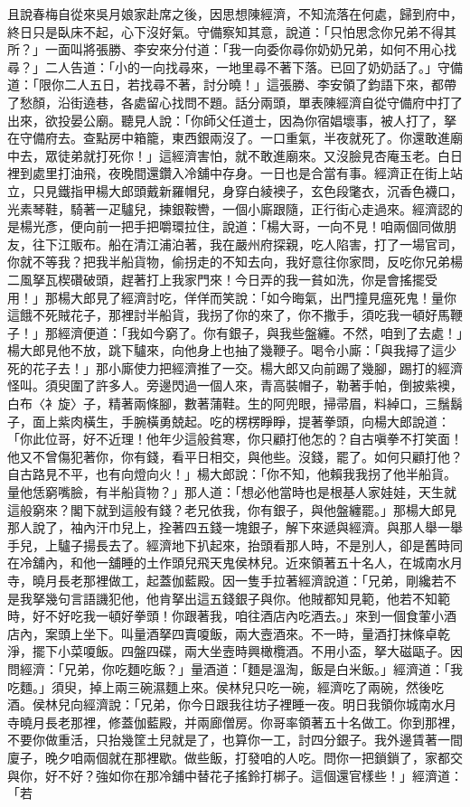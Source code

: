 \begin{showcontents}{}
且說春梅自從來吳月娘家赴席之後，因思想陳經濟，不知流落在何處，歸到府中，終日只是臥床不起，心下沒好氣。守備察知其意，說道：「只怕思念你兄弟不得其所？」一面叫將張勝、李安來分付道：「我一向委你尋你奶奶兄弟，如何不用心找尋？」二人告道：「小的一向找尋來，一地里尋不著下落。已回了奶奶話了。」守備道：「限你二人五日，若找尋不著，討分曉！」這張勝、李安領了鈞語下來，都帶了愁顏，沿街遶巷，各處留心找問不題。話分兩頭，單表陳經濟自從守備府中打了出來，欲投晏公廟。聽見人說：「你師父任道士，因為你宿娼壞事，被人打了，拏在守備府去。查點房中箱籠，東西銀兩沒了。一口重氣，半夜就死了。你還敢進廟中去，眾徒弟就打死你！」這經濟害怕，就不敢進廟來。又沒臉見杏庵玉老。白日裡到處里打油飛，夜晚間還鑽入冷舖中存身。一日也是合當有事。經濟正在街上站立，只見鐵指甲楊大郎頭戴新羅帽兒，身穿白綾襖子，玄色段氅衣，沉香色襪口，光素琴鞋，騎著一疋驢兒，揀銀鞍轡，一個小廝跟隨，正行街心走過來。經濟認的是楊光彥，便向前一把手把嚼環拉住，說道：「楊大哥，一向不見！咱兩個同做朋友，往下江販布。船在清江浦泊著，我在嚴州府探親，吃人陷害，打了一場官司，你就不等我？把我半船貨物，偷拐走的不知去向，我好意往你家問，反吃你兄弟楊二風拏瓦楔礸破頭，趕著打上我家門來！今日弄的我一貧如洗，你是會搖擺受用！」那楊大郎見了經濟討吃，佯佯而笑說：「如今晦氣，出門撞見瘟死鬼！量你這餓不死賊花子，那裡討半船貨，我拐了你的來了，你不撒手，須吃我一頓好馬鞭子！」那經濟便道：「我如今窮了。你有銀子，與我些盤纏。不然，咱到了去處！」楊大郎見他不放，跳下驢來，向他身上也抽了幾鞭子。喝令小廝：「與我撏了這少死的花子去！」那小廝使力把經濟推了一交。楊大郎又向前踢了幾腳，踢打的經濟怪叫。須臾圍了許多人。旁邊閃過一個人來，青高裝帽子，勒著手帕，倒披紫襖，白布〈衤旋〉子，精著兩條腳，數著蒲鞋。生的阿兜眼，掃帚眉，料綽口，三鬚鬍子，面上紫肉橫生，手腕橫勇兢起。吃的楞楞睜睜，提著拳頭，向楊大郎說道：「你此位哥，好不近理！他年少這般貧寒，你只顧打他怎的？自古嗔拳不打笑面！他又不曾傷犯著你，你有錢，看平日相交，與他些。沒錢，罷了。如何只顧打他？自古路見不平，也有向燈向火！」楊大郎說：「你不知，他賴我我拐了他半船貨。量他恁窮嘴臉，有半船貨物？」那人道：「想必他當時也是根基人家娃娃，天生就這般窮來？閣下就到這般有錢？老兄依我，你有銀子，與他盤纏罷。」那楊大郎見那人說了，袖內汗巾兒上，拴著四五錢一塊銀子，解下來遞與經濟。與那人舉一舉手兒，上驢子揚長去了。經濟地下扒起來，抬頭看那人時，不是別人，卻是舊時同在冷舖內，和他一舖睡的土作頭兒飛天鬼侯林兒。近來領著五十名人，在城南水月寺，曉月長老那裡做工，起蓋伽藍殿。因一隻手拉著經濟說道：「兄弟，剛纔若不是我拏幾句言語譏犯他，他肯拏出這五錢銀子與你。他賊都知見範，他若不知範時，好不好吃我一頓好拳頭！你跟著我，咱往酒店內吃酒去。」來到一個食葷小酒店內，案頭上坐下。叫量酒拏四賣嗄飯，兩大壼酒來。不一時，量酒打抹條卓乾淨，擺下小菜嗄飯。四盤四碟，兩大坐壼時興橄欖酒。不用小盃，拏大磁甌子。因問經濟：「兄弟，你吃麵吃飯？」量酒道：「麵是溫淘，飯是白米飯。」經濟道：「我吃麵。」須臾，掉上兩三碗濕麵上來。侯林兒只吃一碗，經濟吃了兩碗，然後吃酒。侯林兒向經濟說：「兄弟，你今日跟我往坊子裡睡一夜。明日我領你城南水月寺曉月長老那裡，修蓋伽藍殿，并兩廊僧房。你哥率領著五十名做工。你到那裡，不要你做重活，只抬幾筐土兒就是了，也算你一工，討四分銀子。我外邊賃著一間廈子，晚夕咱兩個就在那裡歇。做些飯，打發咱的人吃。問你一把鎖鎖了，家都交與你，好不好？強如你在那冷舖中替花子搖鈴打梆子。這個還官樣些！」經濟道：「若
\end{showcontents}
